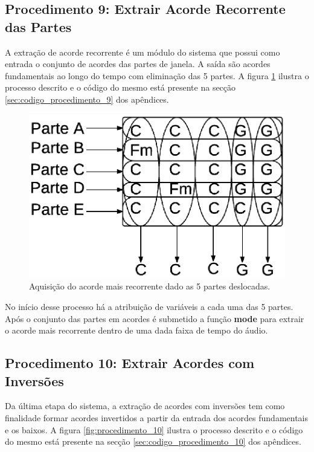 \subsection{Procedimento 9: Extrair Acorde Recorrente das Partes}
\label{subsec:procedimento_9}

A extração de acorde recorrente é um módulo do sistema que possui como entrada o conjunto de acordes das partes de janela. A saída são acordes fundamentais ao longo do tempo com eliminação das 5 partes. A figura \ref{fig:procedimento_9} ilustra o processo descrito e o código do mesmo está presente na secção \ref{sec:codigo_procedimento_9} dos apêndices.

\begin{figure}[h] 
  \centering
    \includegraphics[keepaspectratio=true, scale=0.55]{figuras/procedimento_9}
    \caption{Aquisição do acorde mais recorrente dado as 5 partes deslocadas.}
    \label{fig:procedimento_9}
\end{figure}

No início desse processo há a atribuição de variáveis a cada uma das 5 partes. Após o conjunto das partes em acordes é submetido a função \textbf{mode} para extrair o acorde mais recorrente dentro de uma dada faixa de tempo do áudio.


\subsection{Procedimento 10: Extrair Acordes com Inversões}
\label{subsec:procedimento_10}

Da última etapa do sistema, a extração de acordes com inversões tem como finalidade formar acordes invertidos a partir da entrada dos acordes fundamentais e os baixos. A figura \ref{fig:procedimento_10} ilustra o processo descrito e o código do mesmo está presente na secção \ref{sec:codigo_procedimento_10} dos apêndices.


